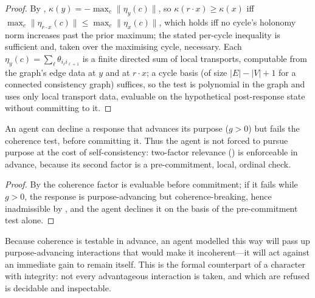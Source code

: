 \documentclass[11pt,twocolumn,a4paper]{article}
\newcommand{\resp}{r}                %
\newcommand{\gain}{g}                %
\newcommand{\coh}{\kappa}            %
\newcommand{\abs}[1]{\lvert#1\rvert}
\newcommand{\norm}[1]{\lVert#1\rVert}
\begin{document}
\begin{proof}
By , $\coh(y)=-\max_c\norm{\eta_y(c)}$, so
$\coh(\resp\!\cdot x)\ge\coh(x)$ iff $\max_c\norm{\eta_{\resp\cdot x}(c)}
\le\max_c\norm{\eta_x(c)}$, which holds iff no cycle's holonomy norm
increases past the prior maximum; the stated per-cycle inequality is
sufficient and, taken over the maximising cycle, necessary. Each
$\eta_y(c)=\sum_\ell\theta_{i_\ell i_{\ell+1}}$ is a finite directed sum of
local transports, computable from the graph's edge data at $y$ and at
$\resp\!\cdot x$; a cycle basis (of size $\abs{E}-\abs{V}+1$ for a
connected consistency graph) suffices, so the test is polynomial in the
graph and uses only local transport data, evaluable on the hypothetical
post-response state without committing to it.
\end{proof}

\begin{corollary}
\label{cor:refuse}
An agent can decline a response that advances its purpose ($\gain>0$) but
fails the coherence test, before committing it. Thus the agent is not
forced to pursue purpose at the cost of self-consistency: two-factor
relevance () is enforceable in advance, because its
second factor is a pre-commitment, local, ordinal check.
\end{corollary}

\begin{proof}
By  the coherence factor is evaluable before commitment;
if it fails while $\gain>0$, the response is purpose-advancing but
coherence-breaking, hence inadmissible by , and the
agent declines it on the basis of the pre-commitment test alone.
\end{proof}

\begin{principle}
\label{prin:integrity}
Because coherence is testable in advance, an agent modelled this way will
pass up purpose-advancing interactions that would make it incoherent---it
will act against an immediate gain to remain itself. This is the formal
counterpart of a character with integrity: not every advantageous
interaction is taken, and which are refused is decidable and inspectable.
\end{principle}
\end{document}
